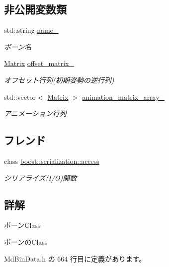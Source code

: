 \subsection*{非公開変数類}
\begin{DoxyCompactItemize}
\item 
std\+::string \mbox{\hyperlink{class_md_bin_data_1_1_mesh_1_1_bone_a3ed12325ffa278847429e758ec08a373}{name\+\_\+}}
\begin{DoxyCompactList}\small\item\em ボーン名 \end{DoxyCompactList}\item 
\mbox{\hyperlink{class_md_bin_data_1_1_matrix}{Matrix}} \mbox{\hyperlink{class_md_bin_data_1_1_mesh_1_1_bone_ab2119901317e2beb384a36d40f31c385}{offset\+\_\+matrix\+\_\+}}
\begin{DoxyCompactList}\small\item\em オフセット行列(初期姿勢の逆行列) \end{DoxyCompactList}\item 
std\+::vector$<$ \mbox{\hyperlink{class_md_bin_data_1_1_matrix}{Matrix}} $>$ \mbox{\hyperlink{class_md_bin_data_1_1_mesh_1_1_bone_a434b2abeb02434b44881e07a0eb7002e}{animation\+\_\+matrix\+\_\+array\+\_\+}}
\begin{DoxyCompactList}\small\item\em アニメーション行列 \end{DoxyCompactList}\end{DoxyCompactItemize}
\subsection*{フレンド}
\begin{DoxyCompactItemize}
\item 
class \mbox{\hyperlink{class_md_bin_data_1_1_mesh_1_1_bone_ac98d07dd8f7b70e16ccb9a01abf56b9c}{boost\+::serialization\+::access}}
\begin{DoxyCompactList}\small\item\em シリアライズ(I/O)関数 \end{DoxyCompactList}\end{DoxyCompactItemize}


\subsection{詳解}
ボーン\+Class 

ボーンの\+Class 

 Md\+Bin\+Data.\+h の 664 行目に定義があります。




